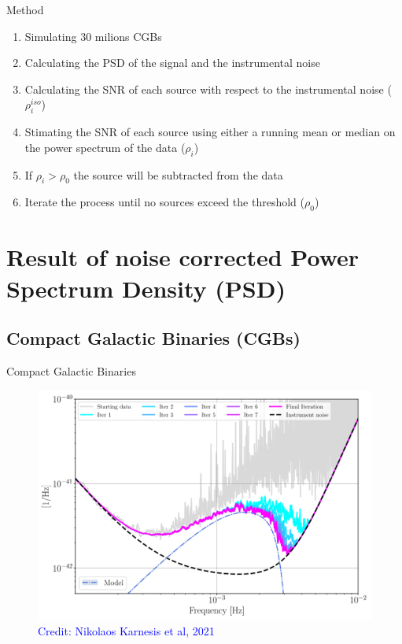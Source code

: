 \documentclass[pdf]{beamer}
\newcommand{\credit}[1]{\tiny{\textcolor{blue}{Credit: #1}}}
\begin{document}
\begin{frame}{Method}
\begin{enumerate}
\item Simulating 30 milions CGBs
\item Calculating the PSD of the signal and the instrumental noise
\item Calculating the SNR of each source with respect to the instrumental noise ($\rho_i^{iso}$)
\item Stimating the SNR of each source using either a running mean or median on the power spectrum of the data ($\rho_i$)
\item If $\rho_i > \rho_0$ the source will be subtracted from the data
\item Iterate the process until no sources exceed the threshold ($\rho_0$)
\end{enumerate}
\end{frame}

\section{Result of noise corrected Power Spectrum Density (PSD)}
\subsection{Compact Galactic Binaries (CGBs)}
\begin{frame}{Compact Galactic Binaries}
\begin{figure}
\includegraphics[scale=.22]{fig/MainPSD.png}
\caption*{\credit{Nikolaos Karnesis et al, 2021}}
\end{figure}
\end{frame}
\end{document}
